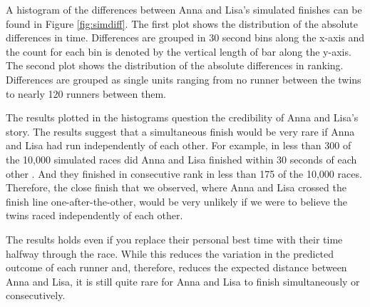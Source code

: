 \documentclass[12pt,titlepage]{article}
\begin{document}
A histogram of the differences between Anna and Lisa's simulated finishes can be found in Figure \ref{fig:simdiff}.  The first plot shows the distribution of the absolute differences in time.  Differences are grouped in 30 second bins along the x-axis and the count for each bin is denoted by the vertical length of bar along the y-axis.  The second plot shows the distribution of the absolute differences in ranking.  Differences are grouped as single units ranging from no runner between the twins to nearly 120 runners between them. 

The results plotted in the histograms question the credibility of Anna and Lisa's story.  The results suggest that  a simultaneous finish would be very rare if Anna and Lisa had run independently of each other.  For example, in less than 300 of the 10,000 simulated races did Anna and Lisa finished within 30 seconds of each other .  And they finished in consecutive rank in less than 175 of the 10,000 races.  Therefore, the close finish that we observed, where Anna and Lisa crossed the finish line one-after-the-other, would be very unlikely if we were to believe the twins raced independently of each other.  

The results holds even if you replace their personal best time with their time halfway through the race.  While this reduces the variation in the predicted outcome of each runner and, therefore, reduces the expected distance between Anna and Lisa, it is still quite rare for Anna and Lisa to finish simultaneously or consecutively.
\end{document}
